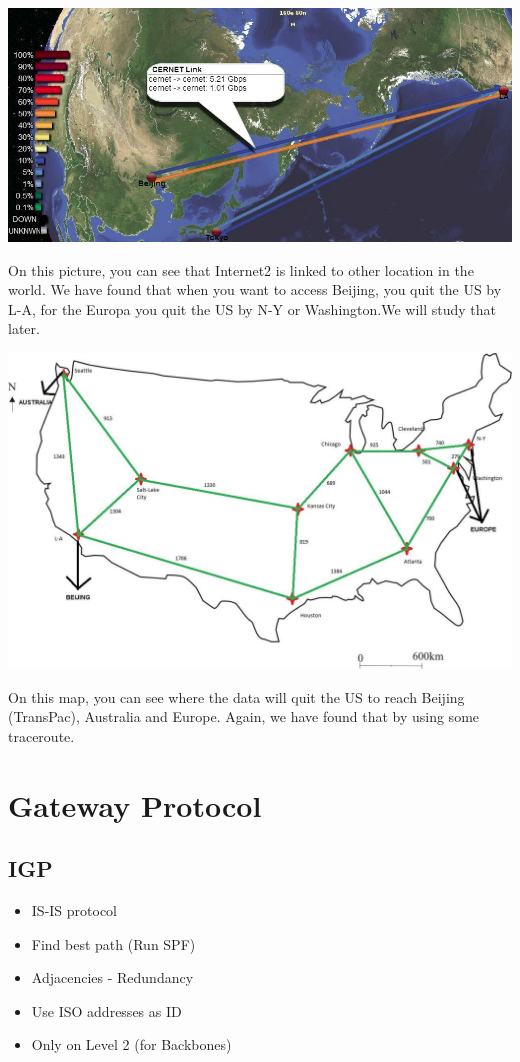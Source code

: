 \documentclass[usenames,dvipsnames]{beamer}
\begin{document}
\begin{frame}{\insertsection}
\begin{center} \includegraphics[width=\textwidth]{japs.png} \end{center}
On this picture, you can see that Internet2 is linked to other location in the world. We have found that when you want to access Beijing, you quit the US by L-A, for the Europa you quit the US by N-Y or Washington.We will study that later.
\end{frame}

\begin{frame}{\insertsection}
\begin{center} \includegraphics[width=.8\textwidth]{australie.jpg} \end{center}
On this map, you can see where the data will quit the US to reach Beijing (TransPac), Australia and Europe. Again, we have found that by using some traceroute.
\end{frame}

\section{Gateway Protocol}
\subsection{IGP}
\begin{frame}{\insertsubsection}
\begin{itemize}
  \item IS-IS protocol
  \item Find best path (Run SPF)
  \item Adjacencies - Redundancy
  \item Use ISO addresses as ID
  \item Only on Level 2 (for Backbones)
\end{itemize}
\end{frame}
\end{document}
